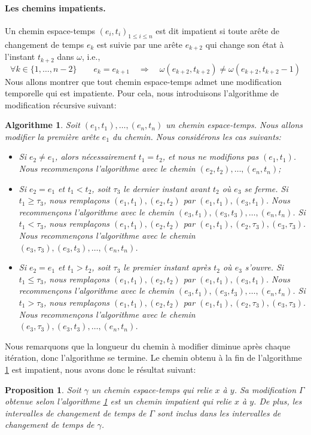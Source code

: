 \documentclass[titlepage,a4paper,12pt]{article}
\newcounter{d}
\newcounter{t}
\newcounter{p}
\newcounter{c}
\newcounter{a}
\newcounter{l}
\newtheorem{prop}[p]{Proposition}
\newtheorem{algo}[a]{Algorithme}
\begin{document}
\paragraph{Les chemins impatients.}
Un chemin espace-temps $(e_i,t_i)_{1\leqslant i \leqslant n}$ est dit impatient si toute arête de changement de temps $e_k$ est suivie par une arête $e_{k+2}$ qui change son état à l'instant $t_{k+2}$ dans $\omega$, i.e.,
$$ \forall k \in \{1,\dots,n-2\} \qquad e_k = e_{k+1} \quad\Rightarrow\quad \omega(e_{k+2},t_{k+2}) \neq \omega(e_{k+2},t_{k+2}-1)
$$
Nous allons montrer que tout chemin espace-temps admet une modification temporelle qui est impatiente. Pour cela, nous introduisons l'algorithme de modification récursive suivant:
\begin{algo} \label{algoimp}Soit $(e_1,t_1),\dots,(e_n,t_n)$ un chemin espace-temps. Nous allons modifier la première arête $e_1$ du chemin. Nous considérons les cas suivants:
\begin{itemize}[label = $\bullet$, leftmargin = *]
\item Si $e_2 \neq e_1$, alors nécessairement $t_1 = t_2$, et nous ne modifions pas $(e_1,t_1)$. Nous recommençons l'algorithme avec le chemin $(e_2,t_2),\dots,(e_n,t_n)$;
\item  Si $e_2 = e_1 $ et $t_1< t_2$, soit $\tau_3$ le dernier instant avant $t_2$ où $e_{3}$ se ferme. Si $t_1 \geqslant \tau_3$, nous remplaçons $(e_1,t_1),(e_2,t_2)$ par $(e_1,t_1),(e_3,t_1)$. Nous recommençons l'algorithme avec le chemin $(e_3,t_1),(e_3,t_3),\dots, (e_n,t_n)$. Si $t_1 < \tau_3$, nous remplaçons $(e_1,t_1),(e_2,t_2)$ par $(e_1,t_1),(e_2,\tau_3),(e_3,\tau_3)$. Nous recommençons l'algorithme avec le chemin $(e_3,\tau_3),(e_3,t_3),\dots,(e_n,t_n)$.
\item Si $e_2=e_1$ et $t_1 > t_2$, soit $\tau_3$ le premier instant après $t_2$ où $e_{3}$ s'ouvre. Si $t_1 \leqslant \tau_3$, nous remplaçons $(e_1,t_1),(e_2,t_2)$ par $(e_1,t_1),(e_3,t_1)$. Nous recommençons l'algorithme avec le chemin $(e_3,t_1),(e_3,t_3),\dots, (e_n,t_n)$. Si $t_1 > \tau_3$, nous remplaçons $(e_1,t_1),(e_2,t_2)$ par $(e_1,t_1),(e_2,\tau_3),(e_3,\tau_3)$. Nous recommençons l'algorithme avec le chemin $(e_3,\tau_3),(e_3,t_3),\dots,(e_n,t_n)$.
\end{itemize}
\end{algo}
Nous remarquons que la longueur du chemin à modifier diminue après chaque itération, donc l'algorithme se termine. Le chemin obtenu à la fin de l'algorithme \ref{algoimp} est impatient, nous avons donc le résultat suivant:
\begin{prop}
Soit $\gamma$ un chemin espace-temps qui relie $x$ à $y$. Sa modification $\Gamma$ obtenue selon l'algorithme \ref{algoimp} est un chemin impatient qui relie $x$ à $y$. De plus, les intervalles de changement de temps de $\Gamma$ sont inclus dans les intervalles de changement de temps de $\gamma$.
\end{prop}
\end{document}
